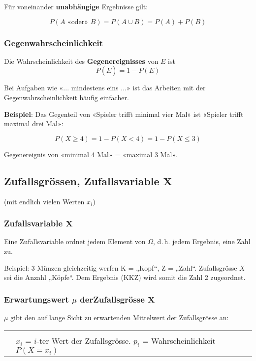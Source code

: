 \begin{multicols}{2}
Für voneinander \textbf{unabhängige} Ergebnisse 
gilt:

$$P(A\textrm{ «oder» }B) = P(A\cup B) = P(A) + P(B)$$
\headerUndFooterJedeSeite{}


\subsubsection*{Gegenwahrscheinlichkeit}
Die Wahrscheinlichkeit des \textbf{Gegenereignisses} von $E$ ist
$$P(\overline{E}) = 1- P(E)$$

Bei Aufgaben wie «... mindestens eins ...» ist das Arbeiten mit der
Gegenwahrscheinlichkeit häufig einfacher.

\textbf{Beispiel}: Das Gegenteil von «Spieler trifft minimal vier Mal»
ist «Spieler trifft maximal drei Mal»:

$$P(X \ge 4) = 1 - P(X < 4) = 1-P(X\le 3)$$

Gegenereignis von «minimal 4 Mal» = «maximal 3 Mal».

\headerUndFooterJedeSeite{}

\forceCB{}
\subsection*{Zufallsgrössen, Zufallsvariable $\mathbf{X}$}
\headerUndFooterJedeSeite{}

(mit endlich vielen Werten $x_i$)

\subsubsection*{Zufallsvariable $\mathbf{X}$}

Eine Zufallsvariable ordnet jedem Element von $\Omega$, d.\,h. jedem
Ergebnis, eine Zahl zu.

Beispiel: 3 Münzen gleichzeitig werfen K = „Kopf“, Z = „Zahl“.
Zufallsgrösse $X$ sei \zB die Anzahl „Köpfe“.
Dem Ergebnis (KKZ) wird somit die Zahl 2 zugeordnet.

\subsubsection*{Erwartungswert $\mu$ derZufallsgrösse $\mathbf{X}$}
$\mu$ gibt den auf lange Sicht zu erwartenden Mittelwert der
Zufallsgrösse an:

\begin{tabular}{cp{5cm}}
\hline\\
\raisebox{-4mm}{\fbox{$\mu=\sum\limits_{i=1}^n x_i\cdot{}p_i$}} & $x_i$ = $i$-ter Wert der
Zufallsgrösse. $p_i$ = Wahrscheinlichkeit  $P(X=x_i)$\\
 \hline
 \end{tabular}


\end{multicols}
